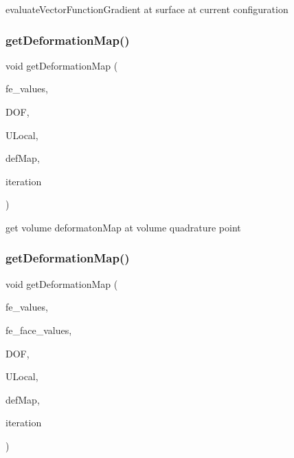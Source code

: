 evaluate\+Vector\+Function\+Gradient at surface at current configuration \mbox{\label{group___evaluation_functions_ga62b026b5bcee0bda21159ff6782b4b59}} 
\subsubsection{\texorpdfstring{get\+Deformation\+Map()}{getDeformationMap()}\hspace{0.1cm}{\footnotesize\ttfamily [1/2]}}
{\footnotesize\ttfamily void get\+Deformation\+Map (\begin{DoxyParamCaption}\item[{const F\+E\+Values$<$ dim $>$ \&}]{fe\+\_\+values,  }\item[{unsigned int}]{D\+OF,  }\item[{Table$<$ 1, T $>$ \&}]{U\+Local,  }\item[{\mbox{\hyperlink{structdeformation_map}{deformation\+Map}}$<$ T, dim $>$ \&}]{def\+Map,  }\item[{unsigned int}]{iteration }\end{DoxyParamCaption})}

get volume deformaton\+Map at volume quadrature point \mbox{\label{group___evaluation_functions_ga239b206235603af9482484c29c8d57ea}} 
\subsubsection{\texorpdfstring{get\+Deformation\+Map()}{getDeformationMap()}\hspace{0.1cm}{\footnotesize\ttfamily [2/2]}}
{\footnotesize\ttfamily void get\+Deformation\+Map (\begin{DoxyParamCaption}\item[{const F\+E\+Values$<$ dim $>$ \&}]{fe\+\_\+values,  }\item[{const F\+E\+Face\+Values$<$ dim $>$ \&}]{fe\+\_\+face\+\_\+values,  }\item[{unsigned int}]{D\+OF,  }\item[{Table$<$ 1, T $>$ \&}]{U\+Local,  }\item[{\mbox{\hyperlink{structdeformation_map}{deformation\+Map}}$<$ T, dim $>$ \&}]{def\+Map,  }\item[{unsigned int}]{iteration }\end{DoxyParamCaption})}

